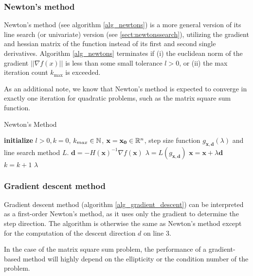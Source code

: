 \documentclass[english, 12pt, a4paper, sci, utf8, a-1b, online, table]{aaltothesis}
\newcommand{\vect}[1]{\ensuremath{\mathbf{#1}}}
\newcommand{\norm}[1]{\ensuremath\Vert #1 \Vert}
\newcommand{\R}{\ensuremath\mathbb{R}}
\newcommand{\N}{\ensuremath\mathbb{N}}
\begin{document}
\subsubsection{Newton's method}


Newton's method (see algorithm \ref{alg_newtons}) is a more general version of its line search (or univariate) version (see \ref{sect:newtonssearch}), utilizing the gradient and hessian matrix of the function instead of its first and second single derivatives. Algorithm \ref{alg_newtons} terminates if (i) the euclidean norm of the gradient $||\nabla f(x)||$ is less than some small tolerance $l > 0$, or (ii) the max iteration count $k_{\text{max}}$ is exceeded.

As an additional note, we know that Newton's method is expected to converge in exactly one iteration for quadratic problems, such as the matrix square sum function. \cite{book:introduction_continuous_optimization} 

\begin{algorithm}[H]
\caption{Newton's Method}
\label{alg_newtons}
\begin{algorithmic}[1]
\STATE \textbf{initialize} $l > 0, k = 0$, $k_{max} \in \N$, $\vect{x} = \vect{x_0} \in \R^n$, step size function $g_{\vect{x}, \vect{d}}(\lambda)$ and line search method $L$.
\WHILE{$\norm{\nabla f(\vect{x})} > l$ \AND $k < k_{max}$}
    \STATE $\vect{d} = -H(\vect{x})^{-1} \nabla f(\vect{x})$
    \STATE $\lambda = L(g_{\vect{x}, \vect{d}})$
    \STATE $\vect{x} = \vect{x} + \lambda \vect{d}$
    \STATE $k = k + 1$
\ENDWHILE
\RETURN $\lambda$
\end{algorithmic}
\end{algorithm}


\subsubsection{Gradient descent method}


Gradient descent method (algorithm \ref{alg_gradient_descent}) can be interpreted as a first-order Newton's method, as it uses only the gradient to determine the step direction. The algorithm is otherwise the same as Newton's method except for the computation of the descent direction $d$ on line 3.

In the case of the matrix square sum problem, the performance of a gradient-based method will highly depend on the ellipticity or the condition number of the problem. \cite{book:introduction_continuous_optimization}
\end{document}
